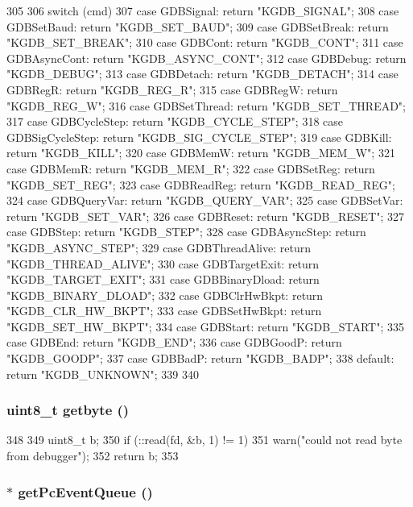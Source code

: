 \begin{DoxyCode}
305 {
306     switch (cmd) {
307       case GDBSignal: return "KGDB_SIGNAL";
308       case GDBSetBaud: return "KGDB_SET_BAUD";
309       case GDBSetBreak: return "KGDB_SET_BREAK";
310       case GDBCont: return "KGDB_CONT";
311       case GDBAsyncCont: return "KGDB_ASYNC_CONT";
312       case GDBDebug: return "KGDB_DEBUG";
313       case GDBDetach: return "KGDB_DETACH";
314       case GDBRegR: return "KGDB_REG_R";
315       case GDBRegW: return "KGDB_REG_W";
316       case GDBSetThread: return "KGDB_SET_THREAD";
317       case GDBCycleStep: return "KGDB_CYCLE_STEP";
318       case GDBSigCycleStep: return "KGDB_SIG_CYCLE_STEP";
319       case GDBKill: return "KGDB_KILL";
320       case GDBMemW: return "KGDB_MEM_W";
321       case GDBMemR: return "KGDB_MEM_R";
322       case GDBSetReg: return "KGDB_SET_REG";
323       case GDBReadReg: return "KGDB_READ_REG";
324       case GDBQueryVar: return "KGDB_QUERY_VAR";
325       case GDBSetVar: return "KGDB_SET_VAR";
326       case GDBReset: return "KGDB_RESET";
327       case GDBStep: return "KGDB_STEP";
328       case GDBAsyncStep: return "KGDB_ASYNC_STEP";
329       case GDBThreadAlive: return "KGDB_THREAD_ALIVE";
330       case GDBTargetExit: return "KGDB_TARGET_EXIT";
331       case GDBBinaryDload: return "KGDB_BINARY_DLOAD";
332       case GDBClrHwBkpt: return "KGDB_CLR_HW_BKPT";
333       case GDBSetHwBkpt: return "KGDB_SET_HW_BKPT";
334       case GDBStart: return "KGDB_START";
335       case GDBEnd: return "KGDB_END";
336       case GDBGoodP: return "KGDB_GOODP";
337       case GDBBadP: return "KGDB_BADP";
338       default: return "KGDB_UNKNOWN";
339     }
340 }
\end{DoxyCode}
\hypertarget{classBaseRemoteGDB_a605a0b1dc1ef87abf31b307291475efd}{
\subsubsection[{getbyte}]{\setlength{\rightskip}{0pt plus 5cm}uint8\_\-t getbyte ()}}
\label{classBaseRemoteGDB_a605a0b1dc1ef87abf31b307291475efd}



\begin{DoxyCode}
348 {
349     uint8_t b;
350     if (::read(fd, &b, 1) != 1)
351         warn("could not read byte from debugger");
352     return b;
353 }
\end{DoxyCode}
\hypertarget{classBaseRemoteGDB_ac57b158f05697ff67c069696646db0b2}{
\subsubsection[{getPcEventQueue}]{ $\ast$ getPcEventQueue ()}}
\label{classBaseRemoteGDB_ac57b158f05697ff67c069696646db0b2}



